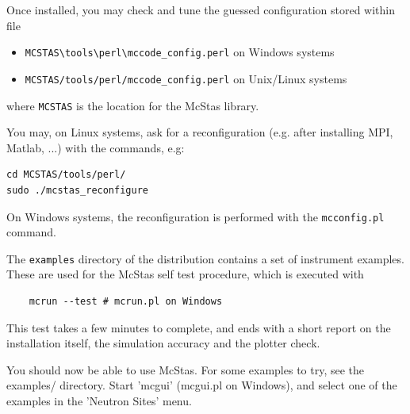 Once installed, you may check and tune the guessed configuration stored within file
\begin{itemize}
\item{\verb+MCSTAS\tools\perl\mccode_config.perl+ on Windows systems}
\item{\verb+MCSTAS/tools/perl/mccode_config.perl+ on Unix/Linux systems}
\end{itemize}
where \verb+MCSTAS+ is the location for the McStas library.

You may, on Linux systems, ask for a reconfiguration (e.g. after installing MPI, Matlab, ...) with the commands, e.g:
\begin{verbatim}
cd MCSTAS/tools/perl/
sudo ./mcstas_reconfigure
\end{verbatim}
On Windows systems, the reconfiguration is performed with the \verb+mcconfig.pl+ command.

The \verb+examples+ directory of the distribution contains a set of instrument examples. These are used for the McStas self test procedure, which is executed with
\begin{verbatim}
    mcrun --test # mcrun.pl on Windows
\end{verbatim}
This test takes a few minutes to complete, and ends with a short report on the installation itself, the simulation accuracy and the plotter check.

You should now be able to use McStas. For some examples to try, see the
examples/ directory. Start 'mcgui' (mcgui.pl on Windows), and select one of the examples in the 'Neutron Sites' menu.
